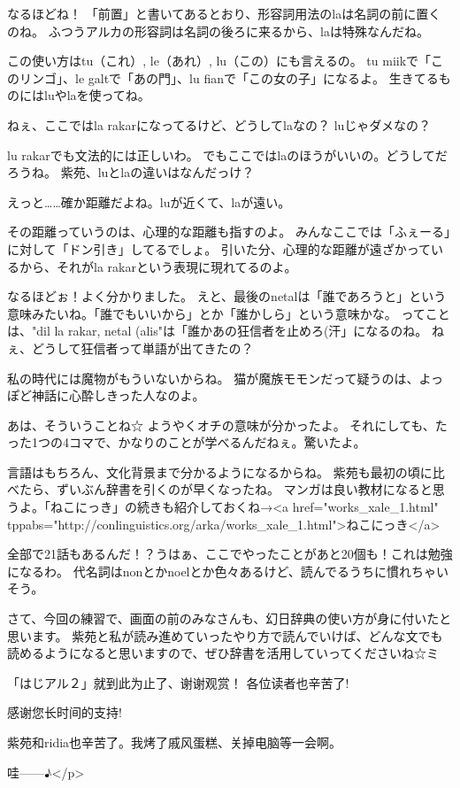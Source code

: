 なるほどね！
「前置」と書いてあるとおり、形容詞用法のlaは名詞の前に置くのね。
ふつうアルカの形容詞は名詞の後ろに来るから、laは特殊なんだね。


この使い方はtu（これ）, le（あれ）, lu（この）にも言えるの。
tu miikで「このリンゴ」、le galtで「あの門」、lu fianで「この女の子」になるよ。
生きてるものにはluやlaを使ってね。


ねぇ、ここではla rakarになってるけど、どうしてlaなの？
luじゃダメなの？


lu rakarでも文法的には正しいわ。
でもここではlaのほうがいいの。どうしてだろうね。
紫苑、luとlaの違いはなんだっけ？


えっと……確か距離だよね。luが近くて、laが遠い。


その距離っていうのは、心理的な距離も指すのよ。
みんなここでは「ふぇーる」に対して「ドン引き」してるでしょ。
引いた分、心理的な距離が遠ざかっているから、それがla rakarという表現に現れてるのよ。


なるほどぉ！よく分かりました。
えと、最後のnetalは「誰であろうと」という意味みたいね。「誰でもいいから」とか「誰かしら」という意味かな。
ってことは、"dil la rakar, netal (alis"は「誰かあの狂信者を止めろ(汗」になるのね。
ねぇ、どうして狂信者って単語が出てきたの？


私の時代には魔物がもういないからね。
猫が魔族モモンだって疑うのは、よっぽど神話に心酔しきった人なのよ。


あは、そういうことね☆
ようやくオチの意味が分かったよ。
それにしても、たった1つの4コマで、かなりのことが学べるんだねぇ。驚いたよ。


言語はもちろん、文化背景まで分かるようになるからね。
紫苑も最初の頃に比べたら、ずいぶん辞書を引くのが早くなったね。
マンガは良い教材になると思うよ。「ねこにっき」の続きも紹介しておくね→<a href="works_xale_1.html" tppabs="http://conlinguistics.org/arka/works_xale_1.html">ねこにっき</a>



全部で21話もあるんだ！？うはぁ、ここでやったことがあと20個も！これは勉強になるわ。
代名詞はnonとかnoelとか色々あるけど、読んでるうちに慣れちゃいそう。


さて、今回の練習で、画面の前のみなさんも、幻日辞典の使い方が身に付いたと思います。
紫苑と私が読み進めていったやり方で読んでいけば、どんな文でも読めるようになると思いますので、ぜひ辞書を活用していってくださいね☆ミ


「はじアル２」就到此为止了、谢谢观赏！
各位读者也辛苦了!


感谢您长时间的支持!

紫苑和ridia也辛苦了。我烤了戚风蛋糕、关掉电脑等一会啊。


哇------♪</p>



